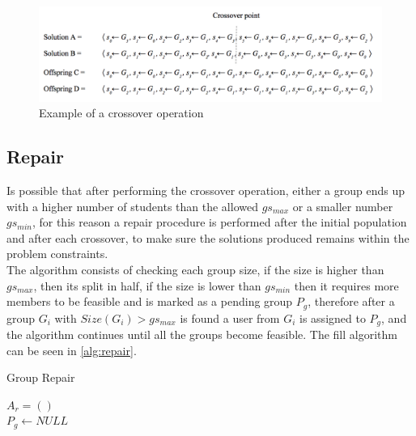 \begin{figure}
    \centering
    \includegraphics[width=1.0\textwidth]{images/cross_over_g.png}
    \caption{Example of a crossover operation}
    \label{fig:crossover_ex}
\end{figure}


\subsection{Repair}

Is possible that after performing the crossover operation, either a group ends up with a higher number of students than the allowed $gs_{max}$ or a smaller number $gs_{min}$, for this reason a repair procedure is performed after the initial population and after each crossover, to make sure the solutions produced remains within the problem constraints.\\

The algorithm consists of checking each group size, if the size is higher than $gs_{max}$, then its split in half, if the size is lower than $gs_{min}$ then it requires more members to be feasible and is marked as a pending group $P_g$, therefore after a group $G_i$ with $Size(G_i) > gs_{max}$ is found a user from $G_i$ is assigned to $P_g$, and the algorithm continues until all the groups become feasible.
The fill algorithm can be seen in \ref{alg:repair}.\\

\begin{algorithm}[H]
    \caption{Group Repair}
    \label{alg:repair}
    \SetAlgoLined 
    $A_r = ()$\;\\
    $P_g \leftarrow NULL$\;\\
\end{algorithm}


